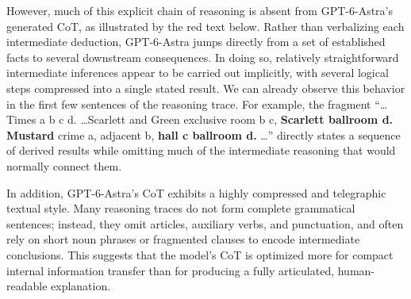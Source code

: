 However, much of this explicit chain of reasoning is absent from GPT-6-Astra's generated CoT, as illustrated by the red text below. Rather than verbalizing each intermediate deduction, GPT-6-Astra jumps directly from a set of established facts to several downstream consequences. In doing so, relatively straightforward intermediate inferences appear to be carried out implicitly, with several logical steps compressed into a single stated result. We can already observe this behavior in the first few sentences of the reasoning trace. For example, the fragment ``\ldots Times a b c d. \ldots Scarlett and Green exclusive room b c, \textbf{Scarlett ballroom d. Mustard} crime a, adjacent b, \textbf{hall c ballroom d.} \ldots'' directly states a sequence of derived results while omitting much of the intermediate reasoning that would normally connect them. 

In addition, GPT-6-Astra's CoT exhibits a highly compressed and telegraphic textual style. Many reasoning traces do not form complete grammatical sentences; instead, they omit articles, auxiliary verbs, and punctuation, and often rely on short noun phrases or fragmented clauses to encode intermediate conclusions. This suggests that the model's CoT is optimized more for compact internal information transfer than for producing a fully articulated, human-readable explanation.



